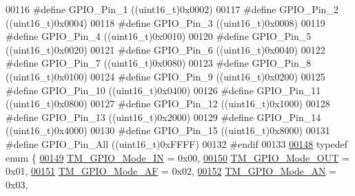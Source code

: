 \begin{DoxyCode}
00116 \textcolor{preprocessor}{#define GPIO\_Pin\_1      ((uint16\_t)0x0002)}
00117 \textcolor{preprocessor}{#define GPIO\_Pin\_2      ((uint16\_t)0x0004)}
00118 \textcolor{preprocessor}{#define GPIO\_Pin\_3      ((uint16\_t)0x0008)}
00119 \textcolor{preprocessor}{#define GPIO\_Pin\_4      ((uint16\_t)0x0010)}
00120 \textcolor{preprocessor}{#define GPIO\_Pin\_5      ((uint16\_t)0x0020)}
00121 \textcolor{preprocessor}{#define GPIO\_Pin\_6      ((uint16\_t)0x0040)}
00122 \textcolor{preprocessor}{#define GPIO\_Pin\_7      ((uint16\_t)0x0080)}
00123 \textcolor{preprocessor}{#define GPIO\_Pin\_8      ((uint16\_t)0x0100)}
00124 \textcolor{preprocessor}{#define GPIO\_Pin\_9      ((uint16\_t)0x0200)}
00125 \textcolor{preprocessor}{#define GPIO\_Pin\_10     ((uint16\_t)0x0400)}
00126 \textcolor{preprocessor}{#define GPIO\_Pin\_11     ((uint16\_t)0x0800)}
00127 \textcolor{preprocessor}{#define GPIO\_Pin\_12     ((uint16\_t)0x1000)}
00128 \textcolor{preprocessor}{#define GPIO\_Pin\_13     ((uint16\_t)0x2000)}
00129 \textcolor{preprocessor}{#define GPIO\_Pin\_14     ((uint16\_t)0x4000)}
00130 \textcolor{preprocessor}{#define GPIO\_Pin\_15     ((uint16\_t)0x8000)}
00131 \textcolor{preprocessor}{#define GPIO\_Pin\_All    ((uint16\_t)0xFFFF)}
00132 \textcolor{preprocessor}{#endif}
00133 
\hypertarget{tm__stm32f4__gpio_8h_source_l00148}{}\hyperlink{group___t_m___g_p_i_o___typedefs_gacbb363a57d0e70ea563e494eff1db3ca}{00148} \textcolor{keyword}{typedef} \textcolor{keyword}{enum} \{
\hypertarget{tm__stm32f4__gpio_8h_source_l00149}{}\hyperlink{group___t_m___g_p_i_o___typedefs_ggacbb363a57d0e70ea563e494eff1db3caa4a1a1cac84d610e1498af9207babf8cf}{00149}     \hyperlink{group___t_m___g_p_i_o___typedefs_ggacbb363a57d0e70ea563e494eff1db3caa4a1a1cac84d610e1498af9207babf8cf}{TM\_GPIO\_Mode\_IN} = 0x00,  
\hypertarget{tm__stm32f4__gpio_8h_source_l00150}{}\hyperlink{group___t_m___g_p_i_o___typedefs_ggacbb363a57d0e70ea563e494eff1db3caa6e5728698978e1610a61c1c3c6fab961}{00150}     \hyperlink{group___t_m___g_p_i_o___typedefs_ggacbb363a57d0e70ea563e494eff1db3caa6e5728698978e1610a61c1c3c6fab961}{TM\_GPIO\_Mode\_OUT} = 0x01, 
\hypertarget{tm__stm32f4__gpio_8h_source_l00151}{}\hyperlink{group___t_m___g_p_i_o___typedefs_ggacbb363a57d0e70ea563e494eff1db3caaa8f2be5601e2cb483e95b035423054c7}{00151}     \hyperlink{group___t_m___g_p_i_o___typedefs_ggacbb363a57d0e70ea563e494eff1db3caaa8f2be5601e2cb483e95b035423054c7}{TM\_GPIO\_Mode\_AF} = 0x02,  
\hypertarget{tm__stm32f4__gpio_8h_source_l00152}{}\hyperlink{group___t_m___g_p_i_o___typedefs_ggacbb363a57d0e70ea563e494eff1db3caa1654d8b26d95020f254506ff9164c07a}{00152}     \hyperlink{group___t_m___g_p_i_o___typedefs_ggacbb363a57d0e70ea563e494eff1db3caa1654d8b26d95020f254506ff9164c07a}{TM\_GPIO\_Mode\_AN} = 0x03,  

\end{DoxyCode}
